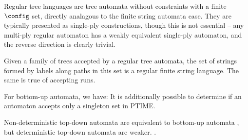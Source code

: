Regular tree languages are tree automata without constraints with a finite
$\config$ set, directly analagous to the finite string automata case.  They
are typically presented as single-ply constructions, though this is not
essential -- any multi-ply regular automaton has a weakly equivalent
single-ply automaton, and the reverse direction is clearly trivial.

Given a family of trees accepted by a regular tree automata, the set of
strings formed by labels along paths in this set is a regular finite string
language.  The same is true of accepting runs.

For bottom-up automata, we have:
It is additionally possible to determine if an automaton accepts only a
singleton set in PTIME.

Non-deterministic top-down automata are equivalent to bottom-up automata
\cite[Thm 1.6.1]{tata}, but deterministic top-down automata are weaker.
\cite[Prop 1.6.2]{tata}.

